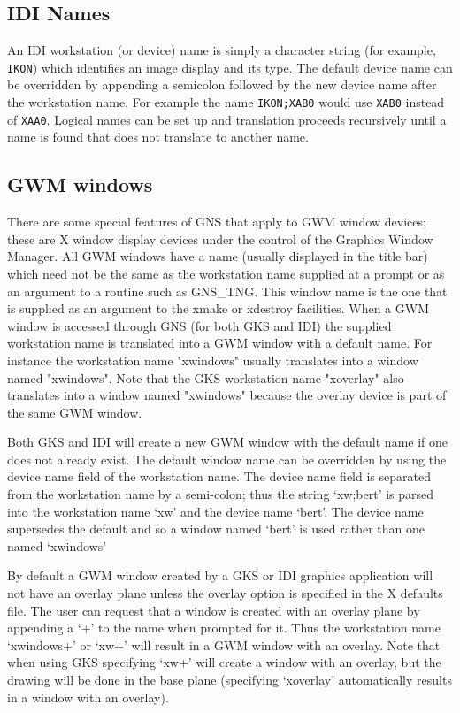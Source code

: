 \subsection{IDI Names}

An IDI workstation (or device) name is simply a character string (for example,
{\tt IKON}) which identifies an image display and its type. The default 
device name can be overridden by appending a semicolon followed by the new
device name after the workstation name. For example the name {\tt IKON;XAB0}
would use {\tt XAB0} instead of {\tt XAA0}. Logical names can be set up and
translation proceeds recursively until a name is found that does not
translate to another name.

\subsection{GWM windows}

There are some special features of GNS that apply to GWM window devices;
these are X window display devices under the control of the Graphics
Window Manager. All GWM windows have a name (usually displayed in the title
bar) which need not be the same as the workstation name supplied at a prompt
or as an argument to a routine such as GNS\_TNG. This window name is the one
that is supplied as an argument to the xmake or xdestroy facilities. When a
GWM window is accessed through GNS (for both GKS and IDI) the supplied
workstation name is translated into a GWM window with a default name. For
instance the workstation name "xwindows" usually translates into a window
named "xwindows". Note that the GKS workstation name "xoverlay" also
translates into a window named "xwindows" because the overlay device is part
of the same GWM window.

Both GKS and IDI will create a new GWM window with the default name
if one does not already exist. The default window name can be overridden
by using the device name field of the workstation name. The device name
field is separated from the workstation name by a semi-colon; thus the
string `xw;bert' is parsed into the workstation name `xw' and the device
name `bert'. The device name supersedes the default and so a window
named `bert' is used rather than one named `xwindows'

By default a GWM window created by a GKS or IDI graphics application
will not have an overlay plane unless the overlay option is specified
in the X defaults file. The user can request that a window is created
with an overlay plane by appending a `+' to the name when prompted for
it. Thus the workstation name `xwindows+' or `xw+' will result in a
GWM window with an overlay. Note that when using GKS specifying `xw+'
will create a window with an overlay, but the drawing will be done in
the base plane (specifying `xoverlay' automatically results in a window
with an overlay).

